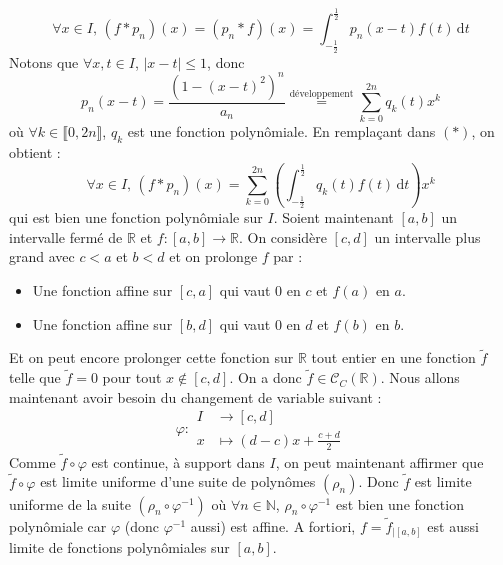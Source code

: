 \begin{demonstration}
		\[ \forall x \in I, \, (f*p_n)(x) = (p_n*f)(x) = \int_{-\frac{1}{2}}^{\frac{1}{2}} p_n(x-t) f(t) \, \mathrm{d}t \tag{$*$} \]
		Notons que $\forall x, t \in I$, $|x-t| \leq 1$, donc
		\[ p_n(x-t) = \frac{(1 - (x-t)^2)^n}{a_n} \overset{\text{développement}}{=} \sum_{k=0}^{2n} q_k(t) x^k \]
		où $\forall k \in \llbracket 0, 2n \rrbracket$, $q_k$ est une fonction polynômiale. En remplaçant dans $(*)$, on obtient :
		\[ \forall x \in I, \, (f*p_n)(x) = \sum_{k=0}^{2n} \left( \int_{-\frac{1}{2}}^{\frac{1}{2}} q_k(t) f(t) \, \mathrm{d}t \right) x^k \]
		qui est bien une fonction polynômiale sur $I$.
		\newpar
		Soient maintenant $[a,b]$ un intervalle fermé de $\mathbb{R}$ et $f : [a, b] \rightarrow \mathbb{R}$. On considère $[c, d]$ un intervalle plus grand avec $c < a$ et $b < d$ et on prolonge $f$ par :
		\begin{itemize}
			\item Une fonction affine sur $[c, a]$ qui vaut $0$ en $c$ et $f(a)$ en $a$.
			\item Une fonction affine sur $[b, d]$ qui vaut $0$ en $d$ et $f(b)$ en $b$.
		\end{itemize}
		Et on peut encore prolonger cette fonction sur $\mathbb{R}$ tout entier en une fonction $\widetilde{f}$ telle que $\widetilde{f} = 0$ pour tout $x \notin [c, d]$. On a donc $\widetilde{f} \in \mathcal{C}_C(\mathbb{R})$. Nous allons maintenant avoir besoin du changement de variable suivant :
		\[ \varphi :
		\begin{array}{cl}
			I &\rightarrow [c, d] \\
			x &\mapsto (d-c)x + \frac{c+d}{2}
		\end{array}
		\]
		Comme $\widetilde{f} \circ \varphi$ est continue, à support dans $I$, on peut maintenant affirmer que $\widetilde{f} \circ \varphi$ est limite uniforme d'une suite de polynômes $(\rho_n)$. Donc $\widetilde{f}$ est limite uniforme de la suite $(\rho_n \circ \varphi^{-1})$ où $\forall n \in \mathbb{N}$, $\rho_n \circ \varphi^{-1}$ est bien une fonction polynômiale car $\varphi$ (donc $\varphi^{-1}$ aussi) est affine. A fortiori, $f = \widetilde{f}_{|[a,b]}$ est aussi limite de fonctions polynômiales sur $[a,b]$.
	\end{demonstration}

